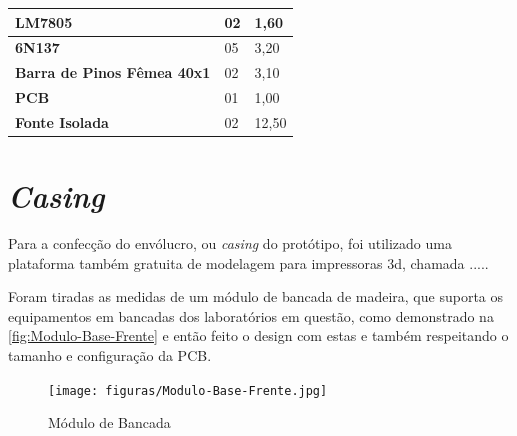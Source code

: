 \begin{table}[!ht]
\begin{tabular}{|l|l|l|}
        \textbf{LM7805}                        & 02                  & 1,60                             \\ \hline
        \textbf{6N137}                         & 05                  & 3,20                             \\ \hline
        \textbf{Barra de Pinos Fêmea 40x1}     & 02                  & 3,10                             \\ \hline
        \textbf{PCB}                           & 01                  & 1,00                             \\ \hline
        \textbf{Fonte Isolada}                 & 02                  & 12,50                            \\ \hline
    \end{tabular}
\end{table}

\section{\textit{Casing}}\label{Casing}

Para a confecção do envólucro, ou \textit{casing} do protótipo, foi utilizado uma plataforma também gratuita de modelagem para impressoras 3d, chamada .....

Foram tiradas as medidas de um módulo de bancada de madeira, que suporta os equipamentos em bancadas dos laboratórios em questão, como demonstrado na \autoref{fig:Modulo-Base-Frente} e então feito o design com estas e também respeitando o tamanho e configuração da \gls{PCB}.

\begin{figure}[htb!]
    \caption{Módulo de Bancada}
    \label{fig:Modulo-Base-Frente}
    \texttt{[image: figuras/Modulo-Base-Frente.jpg]}
    \fonte{}
\end{figure}